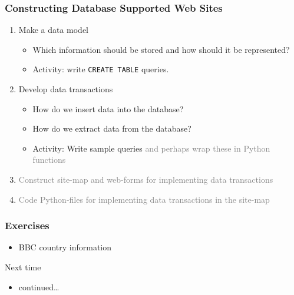 \documentclass[dvipsnames,handout]{beamer}
\begin{document}
\begin{frame}
\frametitle{Constructing Database Supported Web Sites} 

\begin{enumerate}[Step 1:]
  \item Make a data model
    \begin{itemize}
    \item Which information should be stored and how should it be
      represented?
    \item Activity: write \texttt{CREATE TABLE} queries.
    \end{itemize}


  \item Develop data transactions
    \begin{itemize}
    \item How do we insert data into the database?
    \item How do we extract data from the database?
    \item Activity: Write sample \sql{} queries \textcolor{gray}{and perhaps wrap these
      in Python functions}
    \end{itemize}


  \item \textcolor{gray}{Construct site-map and web-forms for implementing data transactions}



  \item \textcolor{gray}{Code Python-files for implementing data transactions in the
    site-map}

\end{enumerate}
\end{frame}



\begin{frame}

\frametitle{Exercises}

\begin{itemize}
\item BBC country information 
\end{itemize}


\begin{block}{Next time}
  \begin{itemize}
  \item \sql{} continued\ldots
  \end{itemize}
\end{block}
\end{frame}
\end{document}
